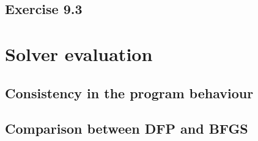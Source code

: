 \documentclass{article}
\begin{document}
\subsection{Exercise 9.3}




\section{Solver evaluation}
\subsection{Consistency in the program behaviour}

\subsection{Comparison between DFP and BFGS}





%
%
%
%
%
%
%
\end{document}
